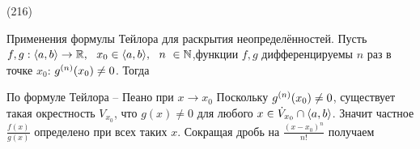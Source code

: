 (216)

\T \q Применения формулы Тейлора для раскрытия неопределённостей. Пусть $f, g :\ang ab \to\R,\s x_0 \in \ang ab,\s n\ \in\N$,функции $f, g$ дифференцируемы $n$ раз в точке $x_0$:   $g^{(n)}(x_0) \neq 0$. Тогда 

\D По формуле Тейлора -- Пеано при $x\to x_0$   Поскольку $g^{(n)}(x_0) \neq 0$, существует такая окрестность $V_{x_0}$, что $g(x) \neq 0$ для любого $x \in \dot{V}_{x_0} \cap \langle a, b \rangle$. Значит частное $\frac{f(x)}{g(x)}$ определено при всех таких $x$. Сокращая дробь на $\frac{(x - x_0)^n}{n!}$ получаем 